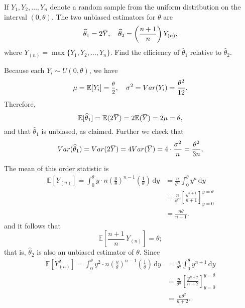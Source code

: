 \begin{example}
    If $Y_1, Y_2, \ldots, Y_n$ denote a random sample from the uniform distribution on the 
    interval $(0, \theta)$. The two unbiased estimators for $\theta$ are 
    \[
        \widehat{\theta}_1 = 2 \ols{Y}, \quad \widehat{\theta}_2 = \left( \frac{n+1}{n}\right) Y_{(n)},
    \]
    where $Y_{(n)} = \max\{ Y_1, Y_2, \ldots, Y_n \}$. Find the efficiency of $\widehat{\theta}_1$ relative to $\widehat{\theta}_2$.
\end{example}
\begin{solution}
    Because each $Y_i \sim U(0, \theta)$, we have
    \[
        \mu = \mathbb{E}[Y_i] = \mfrac{\theta}{2}, \quad \sigma^2 = Var(Y_i) = \frac{\theta^2}{12}.
    \]
    Therefore,
    \[
        \mathbb{E}[\widehat{\theta}_1] = \mathbb{E}(2\ols{Y}) = 2 \mathbb{E}(\ols{Y}) = 2 \mu = \theta,
    \]
    and that $\widehat{\theta}_1$ is unbiased, as claimed. Further we check that 
    \[
        Var(\widehat{\theta}_1) = Var(2\ols{Y}) = 4Var(\ols{Y}) = 4 \cdot \frac{\sigma^2}{n} = \frac{\theta^2}{3n},
    \]

    The mean of this order statistic is 
    \begin{align*}
        \mathbb{E}[Y_{(n)}] = \int^\theta_0 y \cdot n \left(\frac{y}{\theta}\right)^{n-1} \left(\frac{1}{\theta}\right)\, \mathrm{d}y
        &= \frac{n}{\theta^n} \int^\theta_0 y^n \, \mathrm{d}y\\
        &= \frac{n}{\theta^n} \left[ \frac{y^{n+1}}{n+1}\right]^{y=\theta}_{y=0}\\
        &= \frac{n\theta}{n+1}.
    \end{align*}
    and it follows that 
    \[
        \mathbb{E}\left[ \frac{n+1}{n}\, Y_{(n)} \right] = \theta;
    \]
    that is, $\widehat{\theta}_2$ is also an unbiased estimator of $\theta$. Since
    \begin{align*}
        \mathbb{E}[Y^2_{(n)}] = \int^\theta_0 y^2 \cdot n \left(\frac{y}{\theta}\right)^{n-1} \left(\frac{1}{\theta}\right)\, \mathrm{d}y
        &= \frac{n}{\theta^n} \int^\theta_0 y^{n+1} \, \mathrm{d}y\\
        &= \frac{n}{\theta^n} \left[ \frac{y^{n+2}}{n+2}\right]^{y=\theta}_{y=0}\\
        &= \frac{n\theta^2}{n+2}.
    \end{align*}


\end{solution}
